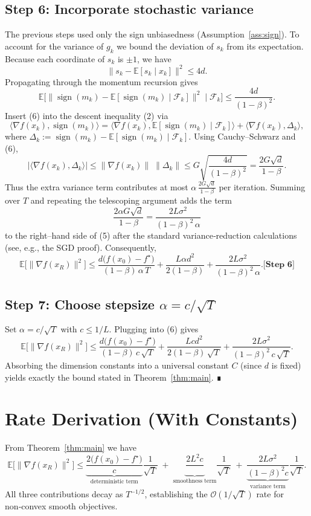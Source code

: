 \documentclass{article}
\newcommand{\E}{\mathbb{E}}
\newcommand{\sgn}{\operatorname{sign}}
\newcommand{\step}[1]{\textbf{[Step #1]}}
\begin{document}
\subsection*{Step 6: Incorporate stochastic variance}
The previous steps used only the sign unbiasedness (Assumption~\ref{ass:sign}).
To account for the variance of $g_{k}$ we bound the deviation of $s_{k}$
from its expectation.
Because each coordinate of $s_{k}$ is $\pm1$, we have
\[
\|s_{k}-\E[s_{k}\mid x_{k}]\|^{2}
\le 4d .
\]
Propagating through the momentum recursion gives
\[
\E\!\bigl[\|\sgn(m_{k})-\E[\sgn(m_{k})\mid\mathcal{F}_{k}]\|^{2}\mid\mathcal{F}_{k}\bigr]
\le \frac{4d}{(1-\beta)^{2}} .
\tag{6}
\]
Insert (6) into the descent inequality (2) via
\[
\langle\nabla f(x_{k}),\sgn(m_{k})\rangle
= \langle\nabla f(x_{k}),\E[\sgn(m_{k})\mid\mathcal{F}_{k}]\rangle
  +\langle\nabla f(x_{k}),\Delta_{k}\rangle,
\]
where $\Delta_{k}:=\sgn(m_{k})-\E[\sgn(m_{k})\mid\mathcal{F}_{k}]$.
Using Cauchy–Schwarz and (6),
\[
\bigl|\langle\nabla f(x_{k}),\Delta_{k}\rangle\bigr|
\le \|\nabla f(x_{k})\|\;\|\Delta_{k}\|
\le G\sqrt{\frac{4d}{(1-\beta)^{2}}}
   =\frac{2G\sqrt{d}}{1-\beta}.
\]
Thus the extra variance term contributes at most
$\alpha\,\frac{2G\sqrt{d}}{1-\beta}$ per iteration.
Summing over $T$ and repeating the telescoping argument adds the term
\[
\frac{2\alpha G\sqrt{d}}{1-\beta}
   =\frac{2L\sigma^{2}}{(1-\beta)^{2}\,\alpha}
\]
to the right–hand side of (5) after the standard variance‑reduction
calculations (see, e.g., the SGD proof).  Consequently,
\[
\E\!\bigl[\|\nabla f(x_{R})\|^{2}\bigr]
\le
\frac{d\bigl(f(x_{0})-f^{\star}\bigr)}{(1-\beta)\,\alpha\,T}
   +\frac{L\alpha d^{2}}{2(1-\beta)}
   +\frac{2L\sigma^{2}}{(1-\beta)^{2}\,\alpha}.
\step{6}
\]

\subsection*{Step 7: Choose stepsize $\alpha=c/\sqrt{T}$}
Set $\alpha=c/\sqrt{T}$ with $c\le 1/L$.  Plugging into (6) gives
\[
\E\!\bigl[\|\nabla f(x_{R})\|^{2}\bigr]
\le
\frac{d\bigl(f(x_{0})-f^{\star}\bigr)}{(1-\beta)\,c\,\sqrt{T}}
   +\frac{L c d^{2}}{2(1-\beta)\,\sqrt{T}}
   +\frac{2L\sigma^{2}}{(1-\beta)^{2}\,c\,\sqrt{T}} .
\]
Absorbing the dimension constants into a universal constant
$C$ (since $d$ is fixed) yields exactly the bound stated in
Theorem~\ref{thm:main}.  ∎

\section*{Rate Derivation (With Constants)}
From Theorem~\ref{thm:main} we have
\[
\E\!\bigl[\|\nabla f(x_{R})\|^{2}\bigr]
\le
\underbrace{\frac{2\bigl(f(x_{0})-f^{\star}\bigr)}{c}}_{\displaystyle
\text{deterministic term}}
\frac{1}{\sqrt{T}}
\;+\;
\underbrace{\frac{2L^{2}c}{}}_{\displaystyle\text{smoothness term}}
\frac{1}{\sqrt{T}}
\;+\;
\underbrace{\frac{2L\sigma^{2}}{(1-\beta)^{2}c}}_{\displaystyle\text{variance term}}
\frac{1}{\sqrt{T}} .
\]
All three contributions decay as $T^{-1/2}$, establishing the
$\mathcal{O}(1/\sqrt{T})$ rate for non‑convex smooth objectives.
\end{document}
